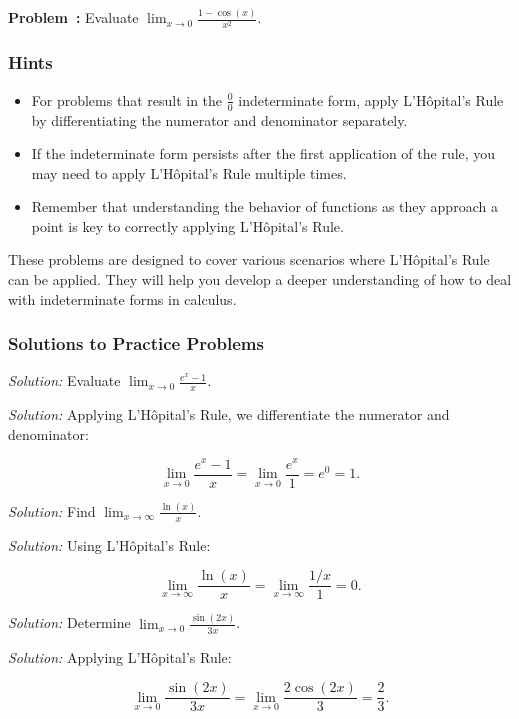 \documentclass[a4paper,12pt]{book}
\newcounter{problem}
\newenvironment{problem}[1][\theproblem]
{\refstepcounter{problem}\par\medskip\noindent\textbf{Problem~#1:} \rmfamily}{\medskip}
\newenvironment{solution}[1][]
{\par\noindent\textit{Solution:} \rmfamily}{\medskip}
\begin{document}
\begin{problem}
Evaluate \( \lim_{x \to 0} \frac{1 - \cos(x)}{x^2} \).
\end{problem}

\subsubsection*{Hints}
\begin{itemize}
  \item For problems that result in the \(\frac{0}{0}\) indeterminate form, apply L'Hôpital's Rule by differentiating the numerator and denominator separately.
  \item If the indeterminate form persists after the first application of the rule, you may need to apply L'Hôpital's Rule multiple times.
  \item Remember that understanding the behavior of functions as they approach a point is key to correctly applying L'Hôpital's Rule.
\end{itemize}

These problems are designed to cover various scenarios where L'Hôpital's Rule can be applied. They will help you develop a deeper understanding of how to deal with indeterminate forms in calculus.

\subsubsection*{Solutions to Practice Problems}

\begin{solution}[to Problem 1]
Evaluate \( \lim_{x \to 0} \frac{e^x - 1}{x} \).

\textit{Solution:}
Applying L'Hôpital's Rule, we differentiate the numerator and denominator:

\[
\lim_{x \to 0} \frac{e^x - 1}{x} = \lim_{x \to 0} \frac{e^x}{1} = e^0 = 1.
\]
\end{solution}

\begin{solution}[to Problem 2]
Find \( \lim_{x \to \infty} \frac{\ln(x)}{x} \).

\textit{Solution:}
Using L'Hôpital's Rule:

\[
\lim_{x \to \infty} \frac{\ln(x)}{x} = \lim_{x \to \infty} \frac{1/x}{1} = 0.
\]
\end{solution}

\begin{solution}[to Problem 3]
Determine \( \lim_{x \to 0} \frac{\sin(2x)}{3x} \).

\textit{Solution:}
Applying L'Hôpital's Rule:

\[
\lim_{x \to 0} \frac{\sin(2x)}{3x} = \lim_{x \to 0} \frac{2\cos(2x)}{3} = \frac{2}{3}.
\]
\end{solution}
\end{document}
